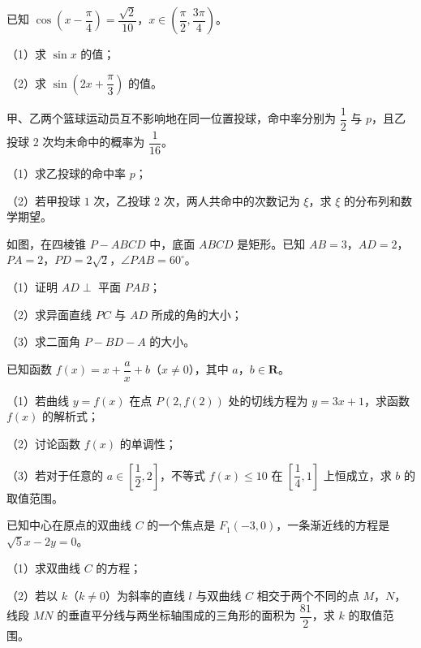 \begin{question}
已知 $\cos\left(x-\dfrac{\pi}4\right)=\dfrac{\sqrt2}{10}$，$x\in\left(\dfrac{\pi}2,\dfrac{3\pi}4\right)$。

（1）求 $\sin x$ 的值；

（2）求 $\sin\left(2x+\dfrac{\pi}3\right)$ 的值。

\end{question}
\begingroup
\renewenvironment{question}{\Needspace{0.46\textheight}}{}
\begin{question}
甲、乙两个篮球运动员互不影响地在同一位置投球，命中率分别为 $\dfrac12$ 与 $p$，且乙投球 $2$ 次均未命中的概率为 $\dfrac1{16}$。

（1）求乙投球的命中率 $p$；

（2）若甲投球 $1$ 次，乙投球 $2$ 次，两人共命中的次数记为 $\xi$，求 $\xi$ 的分布列和数学期望。

\Needspace{0.4\textheight}
\end{question}
\endgroup
\begin{question}
如图，在四棱锥 $P-ABCD$ 中，底面 $ABCD$ 是矩形。已知 $AB=3$，$AD=2$，$PA=2$，$PD=2\sqrt2$，$\angle PAB=60^\circ$。

（1）证明 $AD\perp$ 平面 $PAB$；

（2）求异面直线 $PC$ 与 $AD$ 所成的角的大小；

（3）求二面角 $P-BD-A$ 的大小。
\nopagebreak[4]
\begin{center}\end{center}
\nopagebreak[4]
\end{question}
\begin{question}
已知函数 $f(x)=x+\dfrac ax+b$（$x\neq0$），其中 $a$，$b\in\mathbf R$。

（1）若曲线 $y=f(x)$ 在点 $P(2,f(2))$ 处的切线方程为 $y=3x+1$，求函数 $f(x)$ 的解析式；

（2）讨论函数 $f(x)$ 的单调性；

（3）若对于任意的 $a\in\left[\dfrac12,2\right]$，不等式 $f(x)\leqslant10$ 在 $\left[\dfrac14,1\right]$ 上恒成立，求 $b$ 的取值范围。

\end{question}
\begin{question}
已知中心在原点的双曲线 $C$ 的一个焦点是 $F_1(-3,0)$，一条渐近线的方程是 $\sqrt5x-2y=0$。

（1）求双曲线 $C$ 的方程；

（2）若以 $k$（$k\neq0$）为斜率的直线 $l$ 与双曲线 $C$ 相交于两个不同的点 $M$，$N$，线段 $MN$ 的垂直平分线与两坐标轴围成的三角形的面积为 $\dfrac{81}2$，求 $k$ 的取值范围。

\end{question}

